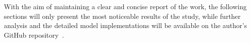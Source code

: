 \documentclass[../main.tex]{subfiles}
\begin{document}
With the aim of maintaining a clear and concise report of the work, the following sections will only present the most noticeable results of the study, while further analysis and the detailed model implementations will be available on the author's GitHub repository~\cite{github}.
\end{document}
